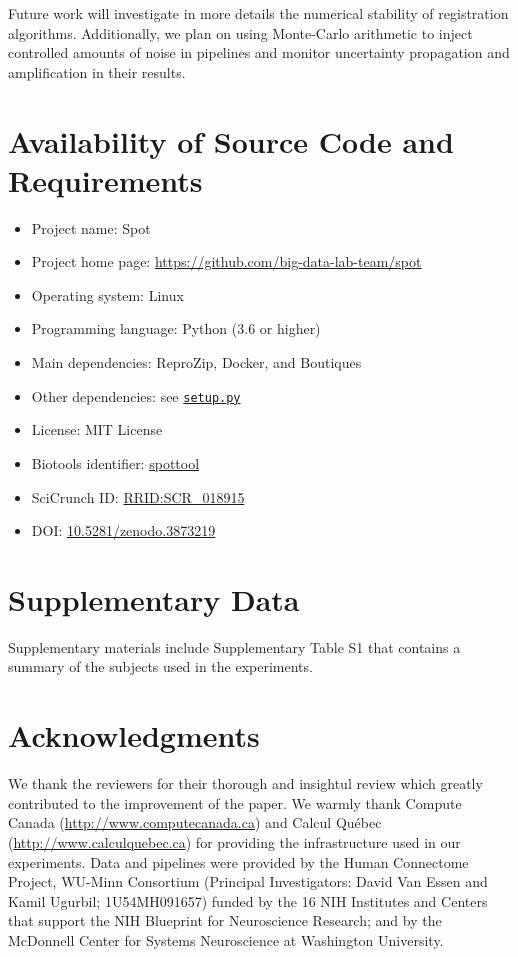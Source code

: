 \documentclass[a4paper,num-refs]{oup-contemporary}
\newcommand{\revised}[1]{\color{blue}#1\color{black}\xspace}
\newcommand{\reprozip}[0]{ReproZip\xspace}
\newcommand{\tristan}[1]{\color{orange}\textbf{From Tristan:}#1\color{black}}
\newcommand{\toolname}[0]{Spot\xspace}
\begin{document}
Future work will investigate in more details the numerical stability of
registration algorithms. Additionally, we plan on using Monte-Carlo arithmetic
to inject controlled amounts of noise in pipelines and monitor
uncertainty propagation and amplification in their results.

\revised{
\section{Availability of Source Code and Requirements}
\begin{itemize}
  \item Project name: \toolname
  \item Project home page: \url{https://github.com/big-data-lab-team/spot}
  \item Operating system: Linux
  \item Programming language: Python (3.6 or higher)
  \item Main dependencies: \reprozip, Docker, and Boutiques
  \item Other dependencies: see \href{https://github.com/big-data-lab-team/spot}{\texttt{setup.py}}
  \item License: MIT License
  \item Biotools identifier: \href{https://bio.tools/spottool}{spottool}
  \item SciCrunch ID: \href{https://scicrunch.org/scicrunch/Resources/record/nlx_144509-1/SCR_018915/resolver}{RRID:SCR\_018915}
  \item DOI: \href{https://doi.org/10.5281/zenodo.3873219}{10.5281/zenodo.3873219}


\end{itemize}

\section{Supplementary Data}
Supplementary materials include Supplementary Table S1 that contains a summary of the subjects used in the experiments.
}

\section{Acknowledgments}
\revised{We thank the reviewers for their thorough and insightul review which greatly contributed to the improvement 
of the paper.}
We warmly thank Compute Canada (\url{http://www.computecanada.ca}) and Calcul
Qu\'ebec (\url{http://www.calculquebec.ca}) for providing the infrastructure used in our experiments.
Data and pipelines were provided by the Human Connectome Project, WU-Minn
Consortium (Principal Investigators: David Van Essen and Kamil Ugurbil;
1U54MH091657) funded by the 16 NIH Institutes and Centers that support
the NIH Blueprint for Neuroscience Research; and by the McDonnell
Center for Systems Neuroscience at Washington University.






\end{document}
